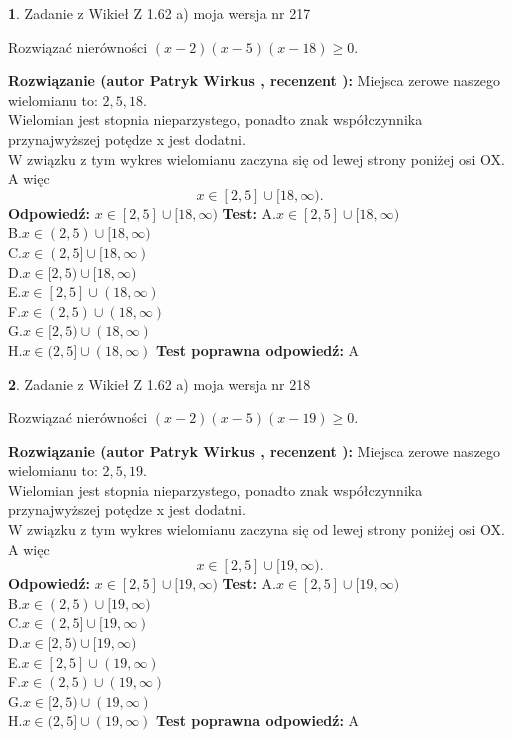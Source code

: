 \documentclass[12pt, a4paper]{article}
\theoremstyle{definition} %
\newtheorem{zad}{}
\newcommand{\zadStart}[1]{\begin{zad}#1\newline}
\newcommand{\zadStop}{\end{zad}}
\newcommand{\rozwStart}[2]{\noindent \textbf{Rozwiązanie (autor #1 , recenzent #2): }\newline}
\newcommand{\rozwStop}{\newline}
\newcommand{\odpStart}{\noindent \textbf{Odpowiedź:}\newline}
\newcommand{\odpStop}{\newline}
\newcommand{\testStart}{\noindent \textbf{Test:}\newline}
\newcommand{\testStop}{\newline}
\newcommand{\kluczStart}{\noindent \textbf{Test poprawna odpowiedź:}\newline}
\newcommand{\kluczStop}{\newline}
\begin{document}
\zadStart{Zadanie z Wikieł Z 1.62 a) moja wersja nr 217}

Rozwiązać nierówności $(x-2)(x-5)(x-18)\ge0$.
\zadStop
\rozwStart{Patryk Wirkus}{}
Miejsca zerowe naszego wielomianu to: $2, 5, 18$.\\
Wielomian jest stopnia nieparzystego, ponadto znak współczynnika przy\linebreak najwyższej potędze x jest dodatni.\\ W związku z tym wykres wielomianu zaczyna się od lewej strony poniżej osi OX. A więc $$x \in [2,5] \cup [18,\infty).$$
\rozwStop
\odpStart
$x \in [2,5] \cup [18,\infty)$
\odpStop
\testStart
A.$x \in [2,5] \cup [18,\infty)$\\
B.$x \in (2,5) \cup [18,\infty)$\\
C.$x \in (2,5] \cup [18,\infty)$\\
D.$x \in [2,5) \cup [18,\infty)$\\
E.$x \in [2,5] \cup (18,\infty)$\\
F.$x \in (2,5) \cup (18,\infty)$\\
G.$x \in [2,5) \cup (18,\infty)$\\
H.$x \in (2,5] \cup (18,\infty)$
\testStop
\kluczStart
A
\kluczStop



\zadStart{Zadanie z Wikieł Z 1.62 a) moja wersja nr 218}

Rozwiązać nierówności $(x-2)(x-5)(x-19)\ge0$.
\zadStop
\rozwStart{Patryk Wirkus}{}
Miejsca zerowe naszego wielomianu to: $2, 5, 19$.\\
Wielomian jest stopnia nieparzystego, ponadto znak współczynnika przy\linebreak najwyższej potędze x jest dodatni.\\ W związku z tym wykres wielomianu zaczyna się od lewej strony poniżej osi OX. A więc $$x \in [2,5] \cup [19,\infty).$$
\rozwStop
\odpStart
$x \in [2,5] \cup [19,\infty)$
\odpStop
\testStart
A.$x \in [2,5] \cup [19,\infty)$\\
B.$x \in (2,5) \cup [19,\infty)$\\
C.$x \in (2,5] \cup [19,\infty)$\\
D.$x \in [2,5) \cup [19,\infty)$\\
E.$x \in [2,5] \cup (19,\infty)$\\
F.$x \in (2,5) \cup (19,\infty)$\\
G.$x \in [2,5) \cup (19,\infty)$\\
H.$x \in (2,5] \cup (19,\infty)$
\testStop
\kluczStart
A
\kluczStop
\end{document}
